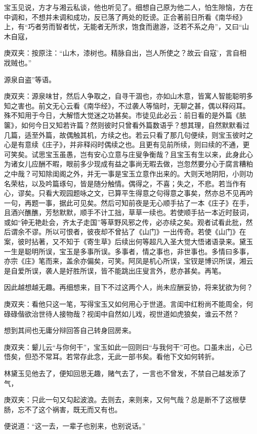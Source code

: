 \begin{parag}
    宝玉见说，方才与湘云私谈，他也听见了。细想自己原为他二人，怕生隙恼，方在中调和，不想并未调和成功，反已落了两处的贬谤。正合著前日所看《南华经》上，有“巧者劳而智者忧，无能者无所求，饱食而遨游，泛若不系之舟”，又曰“山木自寇，\begin{note}庚双夹：按原注：“山木，漆树也。精脉自出，岂人所使之？故云‘自寇’，言自相戕贼也。”\end{note}源泉自盗”等语。\begin{note}庚双夹：源泉味甘，然后人争取之，自寻干涸也，亦如山木意，皆寓人智能聪明多知之害也。前文无心云看《南华经》，不过袭人等恼时，无聊之甚，偶以释闷耳。殊不知用于今日，大解悟大觉迷之功甚矣。市徒见此必云：前日看的是外篇《胠箧》，如何今日又知若许篇？然则彼时只曾看外篇数语乎？想其理，自然默默看过几篇，适至外篇，故偶触其机，方续之也。若云只看了那几句便续，则宝玉彼时之心是有意续《庄子》，并非释闷时偶续之也。且更有见前所续，则曰续的不通，更可笑矣。试思宝玉虽愚，岂有安心立意与庄叟争衡哉？且宝玉有生以来，此身此心为诸女儿应酬不暇，眼前多少现成有益之事尚无暇去做，岂忽然要分心于腐言糟粕之中哉？可知除闺阁之外，并无一事是宝玉立意作出来的。大则天地阴阳，小则功名荣枯，以及吟篇琢句，皆是随分触情。偶得之，不喜；失之，不悲。若当作有心，谬矣。只看大观园题咏之文，已算平生得意之句得意之事矣，然亦总不见再吟一句，再题一事，据此可见矣。然后可知前夜是无心顺手拈了一本《庄子》在手，且酒兴醮醮，芳愁默默，顺手不计工拙，草草一续也。若使顺手拈一本近时鼓词，或如“钟无艳赴会，齐太子走国”等草野风邪之传，必亦续之矣。观者试看此批，然后谓余不谬。所以可恨者，彼夜却不曾拈了《山门》一出传奇。若使《山门》在案，彼时拈著，又不知于《寄生草》后续出何等超凡入圣大觉大悟诸语录来。黛玉一生是聪明所误，宝玉是多事所误。多事者，情之事也，非世事也。多情曰多事，亦宗《庄》笔而来，盖余亦偏矣，可笑。阿凤是机心所误，宝钗是博识所误，湘云是自爱所误，袭人是好胜所误，皆不能跳出庄叟言外，悲亦甚矣。再笔。\end{note}因此越想越无趣。再细想来，目下不过这两个人，尚未应酬妥协，将来犹欲为何？\begin{note}庚双夹：看他只这一笔，写得宝玉又如何用心于世道。言闺中红粉尚不能周全，何碌碌偕欲治世待人接物哉？视闺中自然如儿戏，视世道如虎狼矣，谁云不然？\end{note}想到其间也无庸分辩回答自己转身回房来。\begin{note}庚双夹：颦儿云“与你何干”，宝玉如此一回则曰“与我何干”可也。口虽未出，心已悟矣，但恐不常耳。若常存此念，无此一部书矣。看他下文如何转折。\end{note}林黛玉见他去了，便知回思无趣，赌气去了，一言也不曾发，不禁自己越发添了气，\begin{note}庚双夹：只此一句又勾起波浪。去则去，来则来，又何气哉？总是断不了这根孽肠，忘不了这个祸害，既无而又有也。\end{note}便说道：“这一去，一辈子也别来，也别说话。”
\end{parag}


